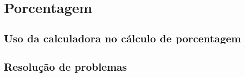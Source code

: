 \chapter{Porcentagem}
\section{Uso da calculadora no cálculo de porcentagem}
\section{Resolução de problemas}